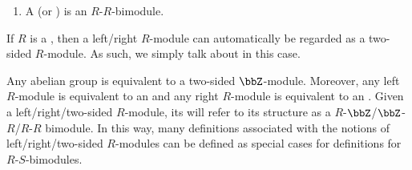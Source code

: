 \begin{definition}
\begin{enumerate}
    \item A  (or ) is an $R$-$R$-bimodule.
    


\end{enumerate}
If $R$ is a , then a left/right $R$-module can automatically be regarded as a two-sided $R$-module. As such, we simply talk about  in this case. 

Any abelian group is equivalent to a two-sided $\bbZ$-module. Moreover, any left $R$-module is equivalent to an  and any right $R$-module is equivalent to an . Given a left/right/two-sided $R$-module, its  will refer to its structure as a $R$-$\bbZ$/$\bbZ$-$R$/$R$-$R$ bimodule. In this way, many definitions associated with the notions of left/right/two-sided $R$-modules can be defined as special cases for definitions for $R$-$S$-bimodules.
\end{definition}
